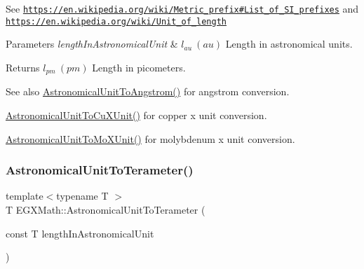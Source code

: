 See \href{https://en.wikipedia.org/wiki/Metric_prefix#List_of_SI_prefixes}{\tt https\+://en.\+wikipedia.\+org/wiki/\+Metric\+\_\+prefix\#\+List\+\_\+of\+\_\+\+S\+I\+\_\+prefixes} and \href{https://en.wikipedia.org/wiki/Unit_of_length}{\tt https\+://en.\+wikipedia.\+org/wiki/\+Unit\+\_\+of\+\_\+length} 
\begin{DoxyParams}{Parameters}
{\em length\+In\+Astronomical\+Unit} & $ l_{au}\ (au)$ Length in astronomical units. \\
\hline
\end{DoxyParams}
\begin{DoxyReturn}{Returns}
$ l_{pm}\ (pm)$ Length in picometers. 
\end{DoxyReturn}
\begin{DoxySeeAlso}{See also}
\mbox{\hyperlink{group___e_g_x_math-_conversions-_length_conversions-_astronomical-_astronomical_unit-_non-_s_i_ga5efd14d5ca13719b7e06c4614ac0faba}{Astronomical\+Unit\+To\+Angstrom()}} for angstrom conversion. 

\mbox{\hyperlink{group___e_g_x_math-_conversions-_length_conversions-_astronomical-_astronomical_unit-_non-_s_i_ga00eedd6324f9a6b31af3ae3fa14ca644}{Astronomical\+Unit\+To\+Cu\+X\+Unit()}} for copper x unit conversion. 

\mbox{\hyperlink{group___e_g_x_math-_conversions-_length_conversions-_astronomical-_astronomical_unit-_non-_s_i_ga8b3dc85e14d6129ebfa2f6336d63bf9c}{Astronomical\+Unit\+To\+Mo\+X\+Unit()}} for molybdenum x unit conversion. 
\end{DoxySeeAlso}
\mbox{\label{group___e_g_x_math-_conversions-_length_conversions-_astronomical-_astronomical_unit-_s_i_gac398353ade6e245157c1aa623792f1e3}} 
\subsubsection{\texorpdfstring{Astronomical\+Unit\+To\+Terameter()}{AstronomicalUnitToTerameter()}}
{\footnotesize\ttfamily template$<$typename T $>$ \\
T E\+G\+X\+Math\+::\+Astronomical\+Unit\+To\+Terameter (\begin{DoxyParamCaption}\item[{const T}]{length\+In\+Astronomical\+Unit }\end{DoxyParamCaption})}



